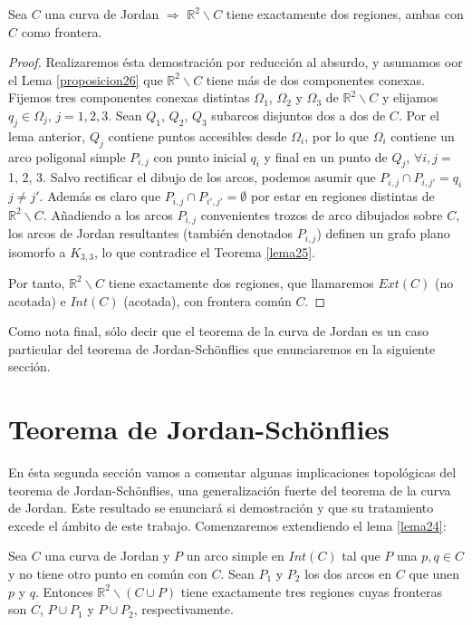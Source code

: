 \begin{theorem}
	Sea $C$ una curva de Jordan $\Rightarrow$ $\mathbb{R}^2 \backslash C$ tiene exactamente dos regiones, ambas con $C$ como frontera.
\end{theorem}

\begin{proof}
Realizaremos ésta demostración por reducción al absurdo, y asumamos oor el Lema \ref{proposicion26}  que $\mathbb{R}^2 \backslash C$ tiene más de dos componentes conexas. Fijemos  tres componentes conexas distintas $\Omega_1$, $\Omega_2$ y $\Omega_3$ de $\mathbb{R}^2 \backslash C$ y elijamos $q_j\in \Omega_j$, $j=1,2,3$.
Sean $Q_1$, $Q_2$, $Q_3$ subarcos disjuntos dos a dos de $C$. 	 Por el lema anterior, $Q_j$ contiene puntos accesibles desde $\Omega_i$, por lo que $\Omega_i$ contiene un arco poligonal simple $P_{i,j}$ con punto inicial $q_i$ y final en un punto de $Q_j$,  $\forall i,j =$ 1, 2, 3. Salvo rectificar el dibujo de los arcos, podemos asumir que $P_{i,j} \cap P_{i,j'} = {q_i}$ $j \neq j'$. Además es claro que $P_{i,j} \cap P_{i',j'} = \emptyset$ por estar en regiones distintas de $\mathbb{R}^2 \backslash C$.
Añadiendo a los arcos $P_{i,j}$ convenientes trozos de arco  dibujados sobre $C$,  los arcos de Jordan resultantes (también denotados $P_{i,j}$) definen un grafo plano isomorfo a $K_{3,3}$, lo que contradice el Teorema \ref{lema25}.

Por tanto, $\mathbb{R}^2 \backslash C$ tiene exactamente dos regiones,  que llamaremos  $Ext(C)$ (no acotada) e $Int(C)$ (acotada), con frontera común $C$.
\end{proof}

Como nota final, sólo decir que el teorema de la curva de Jordan es un caso particular del teorema de Jordan-Schönflies que enunciaremos en la siguiente sección.

\section{Teorema de Jordan-Schönflies}

En ésta segunda sección vamos a comentar algunas implicaciones topológicas del teorema de Jordan-Schönflies, una generalización fuerte del teorema de la curva de Jordan. Este resultado  se enunciará si demostración y que su tratamiento excede el ámbito de este trabajo. 
Comenzaremos extendiendo el lema \ref{lema24}:

\begin{lemma}
	Sea $C$ una curva de Jordan y $P$ un arco   simple en $Int(C)$ tal que $P$ una $p,q \in C$ y no tiene otro punto en común con $C$. Sean $P_1$ y $P_2$ los dos arcos en $C$ que unen $p$ y $q$. Entonces $\mathbb{R}^2 \backslash (C \cup P)$ tiene exactamente tres regiones cuyas fronteras son $C$, $P\cup P_1$ y $P\cup P_2$, respectivamente.
\end{lemma}

